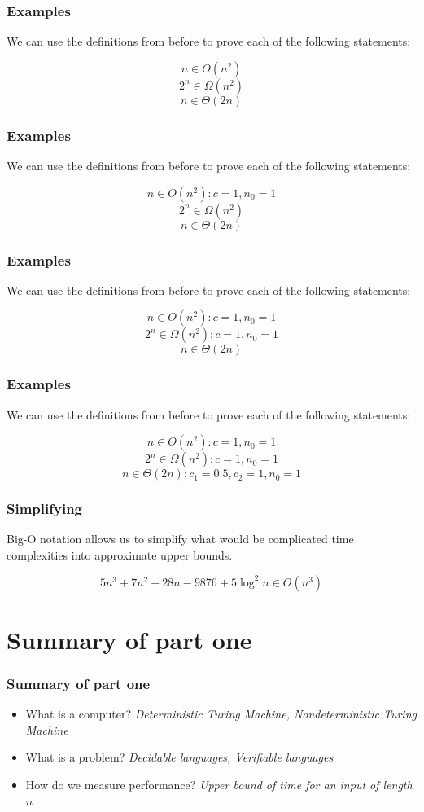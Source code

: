 \documentclass[aspectratio=169]{beamer}
\begin{document}
\begin{frame}
\frametitle{Examples}
We can use the definitions from before to prove each of the following statements:

$$n \in O(n^2)$$
$$2^n \in \Omega(n^2)$$
$$n \in \Theta(2n)$$
\end{frame}

\begin{frame}[noframenumbering]
\frametitle{Examples}
We can use the definitions from before to prove each of the following statements:

$$n \in O(n^2): c = 1, n_0 = 1$$
$$2^n \in \Omega(n^2)$$
$$n \in \Theta(2n)$$
\end{frame}

\begin{frame}[noframenumbering]
\frametitle{Examples}
We can use the definitions from before to prove each of the following statements:

$$n \in O(n^2): c = 1, n_0 = 1$$
$$2^n \in \Omega(n^2): c = 1, n_0 = 1$$
$$n \in \Theta(2n)$$
\end{frame}

\begin{frame}[noframenumbering]
\frametitle{Examples}
We can use the definitions from before to prove each of the following statements:

$$n \in O(n^2): c = 1, n_0 = 1$$
$$2^n \in \Omega(n^2): c = 1, n_0 = 1$$
$$n \in \Theta(2n): c_1 = 0.5, c_2 = 1, n_0 = 1$$
\end{frame}

\begin{frame}
\frametitle{Simplifying}
Big-O notation allows us to simplify what would be complicated time complexities into approximate upper bounds.

$$5n^3 + 7n^2 + 28n - 9876 + 5\log^2 n \in O(n^3)$$
\end{frame}

\section{Summary of part one}

\begin{frame}
\frametitle{Summary of part one}
\begin{itemize}
    \item What is a computer? {\em Deterministic Turing Machine, Nondeterministic Turing Machine}
    \item What is a problem? {\em Decidable languages, Verifiable languages}
    \item How do we measure performance? {\em Upper bound of time for an input of length $n$}
\end{itemize}
\end{frame}
\end{document}
